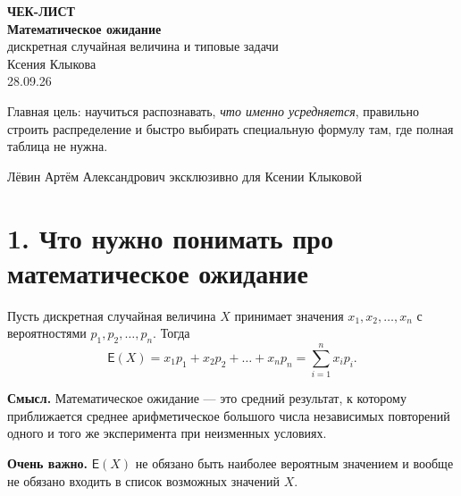 \documentclass[a4paper,12pt]{article}
\newcommand{\LessonDate}{28.09.26}
\newcommand{\E}{\mathsf{E}}
\newcommand{\sectionline}{\par\vspace{0.2em}{\color{accent}\hrule height 0.6pt}\vspace{0.5em}}
\newcommand{\Key}[1]{\textbf{\color{darkaccent}#1}}
\begin{document}
\thispagestyle{empty}
\begin{center}
\vspace*{2.5cm}
{\Large\color{darkaccent}\textbf{ЧЕК-ЛИСТ}}\\[0.8cm]
{\fontsize{28}{34}\selectfont\textbf{Математическое ожидание}}\\[0.45cm]
{\Large дискретная случайная величина и типовые задачи}\\[1.5cm]

{\large Ксения Клыкова}\\[0.4cm]
{\normalsize \LessonDate}\\[2.0cm]

\begin{minipage}{0.72\textwidth}
\centering
\color{textgray}
Главная цель: научиться распознавать, \emph{что именно усредняется}, правильно строить распределение и быстро выбирать специальную формулу там, где полная таблица не нужна.
\end{minipage}

\vfill
{\small\color{textgray}Лёвин Артём Александрович эксклюзивно для Ксении Клыковой}

\vspace{0.8cm}
\end{center}
\clearpage

\section*{1. Что нужно понимать про математическое ожидание}
\sectionline

Пусть дискретная случайная величина $X$ принимает значения $x_1,x_2,\ldots,x_n$ с вероятностями $p_1,p_2,\ldots,p_n$. Тогда
\[
\boxed{\E(X)=x_1p_1+x_2p_2+\dots+x_np_n=\sum_{i=1}^{n}x_ip_i.}
\]

\Key{Смысл.} Математическое ожидание --- это средний результат, к которому приближается среднее арифметическое большого числа независимых повторений одного и того же эксперимента при неизменных условиях.

\Key{Очень важно.} $\E(X)$ не обязано быть наиболее вероятным значением и вообще не обязано входить в список возможных значений $X$.
\end{document}
